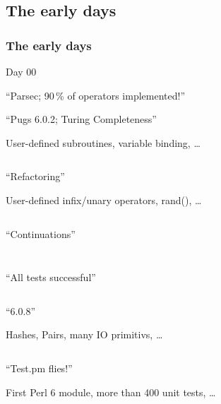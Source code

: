 \documentclass[12pt,compress,english,utf8,t]{beamer}
\begin{document}
\subsection{The early days}
\begin{frame}[fragile]\frametitle{The early days}
  \begin{Mdescription}{Day 00}
    \item<1-2|only@1-2>[Day 4] ``Parsec; 90\,\% of operators implemented!''



    \item<3|only@3>[Day 8] ``Pugs 6.0.2; Turing Completeness''

    User-defined subroutines, variable binding, \ldots\par
    \inputminted{haskell}{code-snippets/day8-eval.hs}

    \item<4|only@4>[Day 12] ``Refactoring''

    User-defined infix/unary operators, rand(), \ldots\par
    \inputminted{haskell}{code-snippets/day12-prim.hs}

    \item<5|only@5>[Day 12] ``Continuations''

    \inputminted{haskell}{code-snippets/day13-monads.hs}
    \bigskip
    \inputminted{haskell}{code-snippets/day13-ast.hs}

    \item<6|only@6>[Day 14] ``All tests successful''

    \inputminted{perl}{code-snippets/day14-basic.pl}

    \item<7|only@7>[Day 20] ``6.0.8''

    Hashes, Pairs, many IO primitivs, \ldots\par
    \inputminted{perl}{code-snippets/day20-ycombinator.pl}

    \item<8|only@8>[Day 23] ``Test.pm flies!''

    First Perl 6 module, more than 400 unit tests, \ldots\par
    \inputminted{perl}{code-snippets/day23-test.pm}
  \end{Mdescription}
\end{frame}
\end{document}
